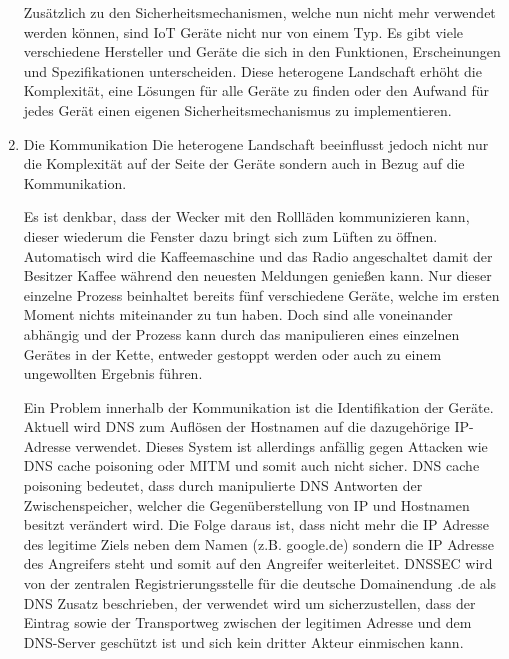 \begin{enumerate}
            Zusätzlich zu den Sicherheitsmechanismen, welche nun nicht mehr verwendet werden können, sind \ac{IoT} Geräte nicht nur von einem Typ. Es gibt viele verschiedene Hersteller und Geräte die sich in den Funktionen, Erscheinungen und Spezifikationen unterscheiden. Diese heterogene Landschaft erhöht die Komplexität, eine Lösungen für alle Geräte zu finden oder den Aufwand für jedes Gerät einen eigenen Sicherheitsmechanismus zu implementieren.
            
            \item Die Kommunikation
            Die heterogene Landschaft beeinflusst jedoch nicht nur die Komplexität auf der Seite der Geräte sondern auch in Bezug auf die Kommunikation.
        
            Es ist denkbar, dass der Wecker mit den Rollläden kommunizieren kann, dieser wiederum die Fenster dazu bringt sich zum Lüften zu öffnen. Automatisch wird die Kaffeemaschine und das Radio angeschaltet damit der Besitzer Kaffee während den neuesten Meldungen genießen kann.
            Nur dieser einzelne Prozess beinhaltet bereits fünf verschiedene Geräte, welche im ersten Moment nichts miteinander zu tun haben. Doch sind alle voneinander abhängig und der Prozess kann durch das manipulieren eines einzelnen Gerätes in der Kette, entweder gestoppt werden oder auch zu einem ungewollten Ergebnis führen.
            
            Ein Problem innerhalb der Kommunikation ist die Identifikation der Geräte. Aktuell wird \ac{DNS} zum Auflösen der Hostnamen auf die dazugehörige IP-Adresse verwendet. Dieses System ist allerdings anfällig gegen Attacken wie DNS cache poisoning oder \ac{MITM} und somit auch nicht sicher.
            DNS cache poisoning bedeutet, dass durch manipulierte DNS Antworten der Zwischenspeicher, welcher die Gegenüberstellung von IP und Hostnamen besitzt verändert wird. Die Folge daraus ist, dass nicht mehr die IP Adresse des legitime Ziels neben dem Namen (z.B. google.de) sondern die IP Adresse des Angreifers steht und somit auf den Angreifer weiterleitet.
            \ac{DNSSEC} wird von der zentralen Registrierungsstelle für die deutsche Domainendung \glqq .de\grqq{} \cite{denic_eg}
            als \ac{DNS} Zusatz beschrieben, der verwendet wird um sicherzustellen, dass der Eintrag sowie der Transportweg zwischen der legitimen Adresse und dem DNS-Server geschützt ist und sich kein dritter Akteur einmischen kann.
        
    \end{enumerate}

